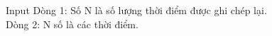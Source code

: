 Input  
Dòng 1: Số N là số lượng thời điểm được ghi chép lại.   
\\   Dòng 2: N số là các thời điểm.